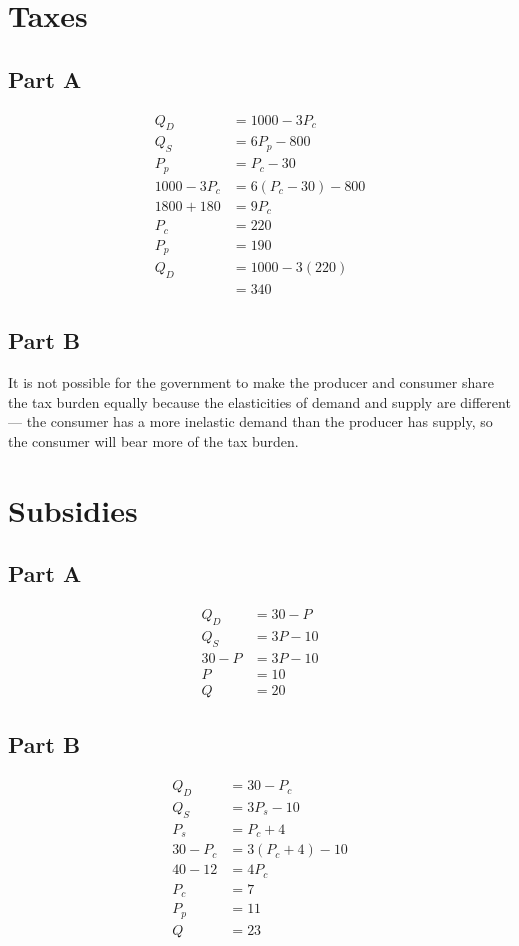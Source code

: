 \documentclass[8pt]{extarticle}
\begin{document}
{\section*{Taxes}
\subsection*{Part A}
\begin{align*}
	Q_D &= 1000 - 3P_{c}\\
	Q_S &= 6P_{p} - 800\\
	P_{p} &= P_{c} - 30 \\
	1000 - 3P_c &= 6(P_c-30) - 800\\
	1800+180 &= 9P_{c}\\
	P_{c} &= 220\\
	P_p &= 190\\
	Q_D &= 1000-3(220)\\
	&= \boxed{340}
\end{align*}
\subsection*{Part B}
It is not possible for the government to make the producer and consumer share the tax burden equally because the elasticities of demand and supply are different — the consumer has a more inelastic demand than the producer has supply, so the consumer will bear more of the tax burden.
\section*{Subsidies}
\subsection*{Part A}
\begin{align*}
	Q_{D} &= 30-P\\
	Q_S &= 3P-10 \\
	30-P &= 3P-10\\
	P &= \boxed{10}\\
	Q &= \boxed{20}
\end{align*}
\subsection*{Part B}
\begin{align*}
	Q_D &= 30-P_c\\
	Q_S &= 3P_s-10\\
	P_s &= P_c + 4\\
	30-P_c &= 3(P_c+4)-10\\
	40-12 &= 4P_c\\
	P_c &= \boxed{7}\\
	P_p &= \boxed{11}\\
	Q &= \boxed{23}
\end{align*}
}
\end{document}
